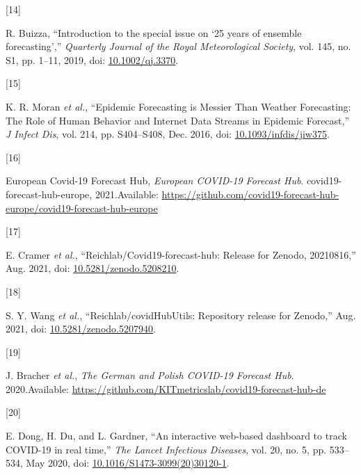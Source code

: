 \documentclass[
]{article}
\newlength{\cslhangindent}
\newlength{\csllabelwidth}
\newlength{\cslentryspacingunit} %
\newenvironment{CSLReferences}[2] %
 {%
  \setlength{\parindent}{0pt}
  \ifodd #1
  \let\oldpar\par
  \def\par{\hangindent=\cslhangindent\oldpar}
  \fi
  \setlength{\parskip}{#2\cslentryspacingunit}
 }%
 {}
\newcommand{\CSLLeftMargin}[1]{\parbox[t]{\csllabelwidth}{#1}}
\newcommand{\CSLRightInline}[1]{\parbox[t]{\linewidth - \csllabelwidth}{#1}\break}
\begin{document}
\begin{CSLReferences}{0}{0}
\leavevmode{}%
\CSLLeftMargin{{[}14{]} }
\CSLRightInline{R. Buizza, {``Introduction to the special issue on {`25
years of ensemble forecasting'},''} \emph{Quarterly Journal of the Royal
Meteorological Society}, vol. 145, no. S1, pp. 1--11, 2019, doi:
\href{https://doi.org/10.1002/qj.3370}{10.1002/qj.3370}.}

\leavevmode{}%
\CSLLeftMargin{{[}15{]} }
\CSLRightInline{K. R. Moran \emph{et al.}, {``Epidemic {Forecasting} is
{Messier Than Weather Forecasting}: {The Role} of {Human Behavior} and
{Internet Data Streams} in {Epidemic Forecast},''} \emph{J Infect Dis},
vol. 214, pp. S404--S408, Dec. 2016, doi:
\href{https://doi.org/10.1093/infdis/jiw375}{10.1093/infdis/jiw375}.}

\leavevmode{}%
\CSLLeftMargin{{[}16{]} }
\CSLRightInline{European Covid-19 Forecast Hub, \emph{European {COVID-19
Forecast Hub}}. {covid19-forecast-hub-europe}, 2021.Available:
\url{https://github.com/covid19-forecast-hub-europe/covid19-forecast-hub-europe}}

\leavevmode{}%
\CSLLeftMargin{{[}17{]} }
\CSLRightInline{E. Cramer \emph{et al.},
{``Reichlab/Covid19-forecast-hub: Release for {Zenodo}, 20210816,''}
Aug. 2021, doi:
\href{https://doi.org/10.5281/zenodo.5208210}{10.5281/zenodo.5208210}.}

\leavevmode{}%
\CSLLeftMargin{{[}18{]} }
\CSLRightInline{S. Y. Wang \emph{et al.}, {``Reichlab/{covidHubUtils}:
Repository release for {Zenodo},''} Aug. 2021, doi:
\href{https://doi.org/10.5281/zenodo.5207940}{10.5281/zenodo.5207940}.}

\leavevmode{}%
\CSLLeftMargin{{[}19{]} }
\CSLRightInline{J. Bracher \emph{et al.}, \emph{The {German} and {Polish
COVID-19 Forecast Hub}}. 2020.Available:
\url{https://github.com/KITmetricslab/covid19-forecast-hub-de}}

\leavevmode{}%
\CSLLeftMargin{{[}20{]} }
\CSLRightInline{E. Dong, H. Du, and L. Gardner, {``An interactive
web-based dashboard to track {COVID-19} in real time,''} \emph{The
Lancet Infectious Diseases}, vol. 20, no. 5, pp. 533--534, May 2020,
doi:
\href{https://doi.org/10.1016/S1473-3099(20)30120-1}{10.1016/S1473-3099(20)30120-1}.}


\end{CSLReferences}
\end{document}
